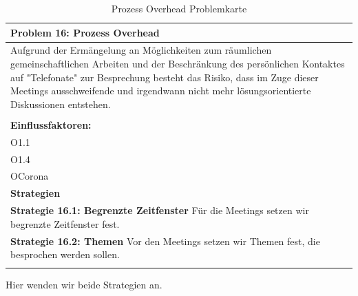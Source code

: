 \documentclass[fontsize=12pt,paper=a4,twoside]{scrartcl}
\begin{document}
\begin{table}[H]
    \centering
    \begin{tabular}{|p{15cm}|}
    \hline
          \textbf{Problem 16: Prozess Overhead}  \\ \hline
	Aufgrund der Ermängelung an Möglichkeiten zum räumlichen gemeinschaftlichen Arbeiten und der Beschränkung des persönlichen Kontaktes auf "Telefonate" zur Besprechung besteht das Risiko, dass im Zuge dieser Meetings ausschweifende und irgendwann nicht mehr lösungsorientierte Diskussionen entstehen. \\
         \\ \hline
          \textbf{Einflussfaktoren: } \\
	O1.1 \\
	O1.4 \\
	OCorona \\
          \hline
          \textbf{Strategien} \\ \hline
            {}          
           \label{strategie:16.1}     
          \textbf{Strategie 16.1: Begrenzte Zeitfenster} Für die Meetings setzen wir begrenzte Zeitfenster fest.  \\        
  {}          
           \label{strategie:16.2}              
          \textbf{Strategie 16.2: Themen} Vor den Meetings setzen wir Themen fest, die besprochen werden sollen.  \\
	 \\ \hline
    \end{tabular}

    \caption{Prozess Overhead Problemkarte}
    \label{tab:ProblemKarte16}
\end{table}
Hier wenden wir beide Strategien an.  \\
\end{document}
